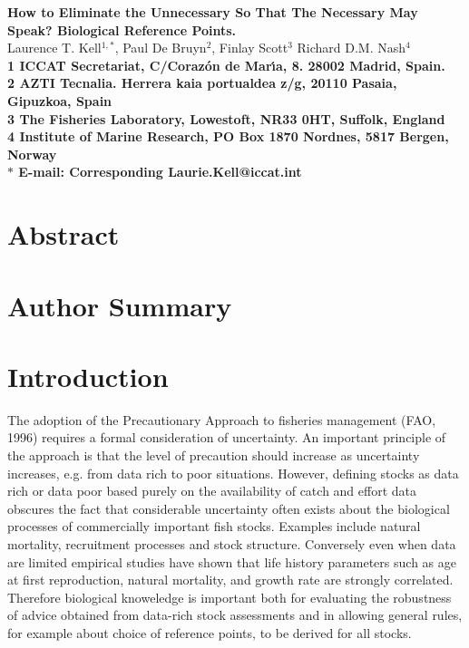 \documentclass[10pt]{article}
\date{}
\begin{document}
\begin{flushleft}
{\Large
\textbf{How to Eliminate the Unnecessary So That The Necessary May Speak? Biological Reference Points.}
}
\\
Laurence T. Kell$^{1,\ast}$, 
Paul De Bruyn$^{2}$, 
Finlay Scott$^{3}$
Richard D.M. Nash$^{4}$
\\
\bf{1}  ICCAT Secretariat, C/Coraz\'{o}n de Mar\'{\i}a, 8. 28002 Madrid, Spain.
\\
\bf{2}  AZTI Tecnalia. Herrera kaia portualdea z/g, 20110 Pasaia, Gipuzkoa, Spain
\\
\bf{3}  The Fisheries Laboratory, Lowestoft, NR33 0HT, Suffolk, England
\\
\bf{4}  Institute of Marine Research, PO Box 1870 Nordnes, 5817 Bergen, Norway
\\
$\ast$ E-mail: Corresponding Laurie.Kell@iccat.int
\end{flushleft}

\section*{Abstract}

\section*{Author Summary}

\section*{Introduction}


The adoption of the Precautionary Approach to fisheries management (FAO, 1996) requires a formal consideration of uncertainty. An important principle 
of the approach is that the level of precaution  should increase as uncertainty increases, e.g. from data rich to poor situations. However, defining stocks
as data rich or data poor based purely on the availability of catch and effort data obscures the fact that considerable uncertainty often exists about the 
biological processes of commercially important fish stocks. Examples include natural mortality, recruitment processes and stock structure. 
Conversely even when data are limited empirical studies have shown that life history parameters 
such as age at first reproduction, natural mortality, and growth rate are strongly correlated. Therefore biological knoweledge is important both
for evaluating the robustness of advice obtained from data-rich stock assessments and in allowing general rules, for example about choice of reference points, 
to be derived for all stocks.
\end{document}
